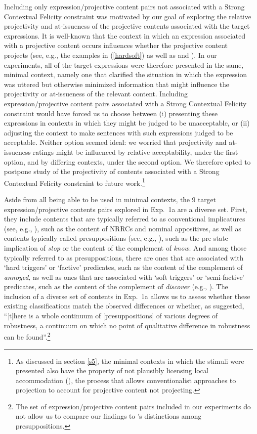 \documentclass[11pt,fleqn]{article}
\newcommand{\6}{\mbox{$[\hspace*{-.6mm}[$}}
\newcommand{\9}{\mbox{$]\hspace*{-.6mm}]$}}
\newcommand{\citepos}[1]{\citeauthor{#1}'s \citeyear{#1}}
\begin{document}
Including only expression/projective content pairs not associated with a Strong Contextual Felicity constraint was motivated by our goal of exploring the relative projectivity and at-issueness of the projective contents associated with the target expressions. It is well-known that the context in which an expression associated with a projective content occurs influences whether the projective content projects (see, e.g., the examples in (\ref{hardsoft}) as well as \citealt{simons01} and \citealt{beaver-belly}). In our experiments, all of the target expressions were therefore presented in the same, minimal context, namely one that clarified the situation in which the expression was uttered but  otherwise minimized information that might influence the projectivity or at-issueness of the relevant content. Including expression/projective content pairs associated with a Strong Contextual Felicity constraint would have forced us to choose between (i) presenting these expressions in contexts in which they might be judged to be unacceptable, or (ii) adjusting the context to make sentences with such expressions judged to be acceptable. Neither option seemed ideal: we worried that projectivity and at-issueness ratings might be influenced by relative acceptability, under the first option, and by differing contexts, under the second option. We therefore opted to postpone study of the projectivity of contents associated with a Strong Contextual Felicity constraint to future work.\footnote{As discussed in section \ref{s5}, the minimal contexts in which the stimuli were presented also have the property of not plausibly licensing local accommodation (\citealt{heim83,vds92}), the process that allows conventionalist approaches to projection to account for projective content not projecting.}

Aside from all being able to be used in minimal contexts, the 9 target expression/projective contents pairs explored in Exp.~1a are a diverse set. First, they include contents that are typically referred to as conventional implicatures (see, e.g., \citealt{potts05}), such as the content of NRRCs and nominal appositives, as well as contents typically called presuppositions (see, e.g., \citealt{heim83,abrusan2011}), such as the pre-state implication of {\em stop} or the content of the complement of {\em know}. And among those typically referred to as presuppositions, there are ones that are associated with `hard triggers' or `factive' predicates, such as the content of the complement of {\em annoyed}, as well as ones that are associated with `soft triggers' or `semi-factive' predicates, such as the content of the complement of {\em discover} (e.g., \citealt{karttunen71b,simons01,potts05,abusch10,beaver-belly}). The inclusion of a diverse set of contents in Exp.~1a allows us to assess whether these existing classifications match the observed differences or whether, as \citet[223]{kadmon01} suggested, ``[t]here is a whole continuum of [presuppositions] of various degrees of robustness, a continuum on which no point of qualitative difference in robustness can be found''.\footnote{The set of expression/projective content pairs included in our experiments do not allow us to compare our findings to \citepos{zeevat92} distinctions among presuppositions.}
\end{document}
